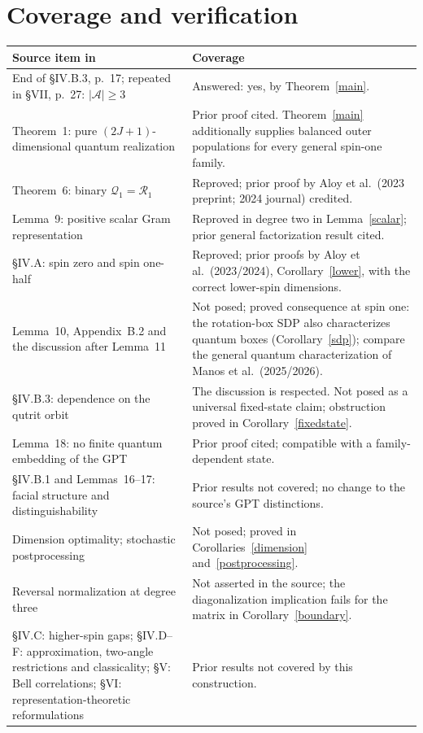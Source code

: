 \documentclass[11pt]{article}
\begin{document}
\section{Coverage and verification}
\begin{longtable}{@{}p{.42\linewidth}p{.53\linewidth}@{}}
\toprule
Source item in \cite{AGJLM} & Coverage\\
\midrule
End of \S IV.B.3, p.~17; repeated in \S VII, p.~27:
$|\mathcal A|\geq3$
 & Answered: yes, by Theorem~\ref{main}.\\
Theorem~1: pure $(2J+1)$-dimensional quantum realization
 & Prior proof cited. Theorem~\ref{main} additionally supplies balanced
 outer populations for every general spin-one family.\\
Theorem~6: binary $\mathcal Q_1=\mathcal R_1$
 & Reproved; prior proof by Aloy et al.\ (2023 preprint; 2024 journal) credited.\\
Lemma~9: positive scalar Gram representation
 & Reproved in degree two in Lemma~\ref{scalar}; prior general
 factorization result cited.\\
\S IV.A: spin zero and spin one-half
 & Reproved; prior proofs by Aloy et al.\ (2023/2024),
 Corollary~\ref{lower}, with the correct lower-spin dimensions.\\
Lemma~10, Appendix~B.2 and the discussion after Lemma~11
 & Not posed; proved consequence at spin one: the rotation-box SDP also characterizes
 quantum boxes (Corollary~\ref{sdp}); compare the general quantum
 characterization of Manos et al.\ (2025/2026).\\
\S IV.B.3: dependence on the qutrit orbit
 & The discussion is respected. Not posed as a universal fixed-state
 claim; obstruction proved in Corollary~\ref{fixedstate}.\\
Lemma~18: no finite quantum embedding of the GPT
 & Prior proof cited; compatible with a family-dependent state.\\
\S IV.B.1 and Lemmas~16--17: facial structure and distinguishability
 & Prior results not covered; no change to the source's GPT distinctions.\\
Dimension optimality; stochastic postprocessing
 & Not posed; proved in Corollaries~\ref{dimension} and~\ref{postprocessing}.\\
Reversal normalization at degree three
 & Not asserted in the source; the diagonalization implication fails
 for the matrix in Corollary~\ref{boundary}.\\
\S IV.C: higher-spin gaps; \S IV.D--F: approximation, two-angle
 restrictions and classicality; \S V: Bell correlations;
 \S VI: representation-theoretic reformulations
 & Prior results not covered by this construction.\\
\bottomrule
\end{longtable}
\end{document}
